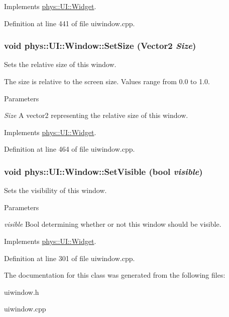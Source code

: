 Implements \hyperlink{classphys_1_1UI_1_1Widget_aae1c0b891125823e7ade8cbc7e4ba6b6}{phys::UI::Widget}.



Definition at line 441 of file uiwindow.cpp.

\hypertarget{classphys_1_1UI_1_1Window_adbd4d4c908c3d3458139e87bf16006bf}{
\subsubsection[{SetSize}]{\setlength{\rightskip}{0pt plus 5cm}void phys::UI::Window::SetSize ({\bf Vector2} {\em Size})}}
\label{d4/d86/classphys_1_1UI_1_1Window_adbd4d4c908c3d3458139e87bf16006bf}


Sets the relative size of this window. 

The size is relative to the screen size. Values range from 0.0 to 1.0. 
\begin{DoxyParams}{Parameters}
\item[{\em Size}]A vector2 representing the relative size of this window. \end{DoxyParams}


Implements \hyperlink{classphys_1_1UI_1_1Widget_ad5af5f04b60d43341037df6b0e329bbd}{phys::UI::Widget}.



Definition at line 464 of file uiwindow.cpp.

\hypertarget{classphys_1_1UI_1_1Window_a351439e78013bc87ecadcc00bce08573}{
\subsubsection[{SetVisible}]{\setlength{\rightskip}{0pt plus 5cm}void phys::UI::Window::SetVisible (bool {\em visible})}}
\label{d4/d86/classphys_1_1UI_1_1Window_a351439e78013bc87ecadcc00bce08573}


Sets the visibility of this window. 


\begin{DoxyParams}{Parameters}
\item[{\em visible}]Bool determining whether or not this window should be visible. \end{DoxyParams}


Implements \hyperlink{classphys_1_1UI_1_1Widget_ab049233d8d5522a6ab42654b8924a3e0}{phys::UI::Widget}.



Definition at line 301 of file uiwindow.cpp.



The documentation for this class was generated from the following files:\begin{DoxyCompactItemize}
\item 
uiwindow.h\item 
uiwindow.cpp\end{DoxyCompactItemize}
